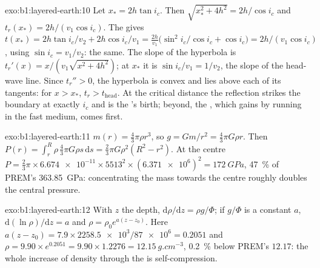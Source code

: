 \begin{solution}{exo:b1:layered-earth:10}
Let $x_* = 2h\tan i_c$. Then $\sqrt{x_*^2 + 4h^2} = 2h/\cos i_c$ and
$t_r(x_*) = 2h/(v_1\cos i_c)$. The  gives
$t(x_*) = 2h\tan i_c/v_2 + 2h\cos i_c/v_1 = \frac{2h}{v_1}\bigl(\sin^2 i_c/\cos
i_c + \cos i_c\bigr) = 2h/(v_1\cos i_c)$, using $\sin i_c = v_1/v_2$: the same.
The slope of the hyperbola is $t_r'(x) = x/(v_1\sqrt{x^2 + 4h^2})$; at $x_*$ it is
$\sin i_c/v_1 = 1/v_2$, the slope of the head-wave line. Since
$t_r'' > 0$, the hyperbola is convex and lies above each of its tangents: for
$x > x_*$, $t_r > t_{\text{head}}$. At the critical distance the reflection
strikes the boundary at exactly $i_c$ and is the 's birth; beyond,
the , which gains by running in the fast medium, comes first.
\end{solution}

\begin{solution}{exo:b1:layered-earth:11}
$m(r) = \tfrac43\pi\rho r^3$, so $g = Gm/r^2 = \tfrac43\pi G\rho r$. Then
$P(r) = \int_r^R \rho\,\tfrac43\pi G\rho s\,\mathrm ds = \tfrac23\pi G\rho^2(R^2
- r^2)$. At the centre $P = \tfrac23\pi\times\num{6.674e-11}\times5513^2\times
(\num{6.371e6})^2 = \qty{172}{GPa}$, \qty{47}{\percent} of PREM's
\qty{363.85}{GPa}: concentrating the mass towards the centre roughly doubles
the central pressure.
\end{solution}

\begin{solution}{exo:b1:layered-earth:12}
With $z$ the depth, $\mathrm d\rho/\mathrm dz = \rho g/\Phi$; if $g/\Phi$ is a
constant $a$, $\mathrm d(\ln\rho)/\mathrm dz = a$ and $\rho = \rho_0
e^{a(z - z_0)}$. Here $a(z - z_0) = 7.9\times\num{2258.5e3}/\num{87e6} =
0.2051$ and $\rho = 9.90\times e^{0.2051} = 9.90\times1.2276 =
\qty{12.15}{g.cm^{-3}}$, \qty{0.2}{\percent} below PREM's $12.17$: the whole
increase of density through the  is self-compression.
\end{solution}

